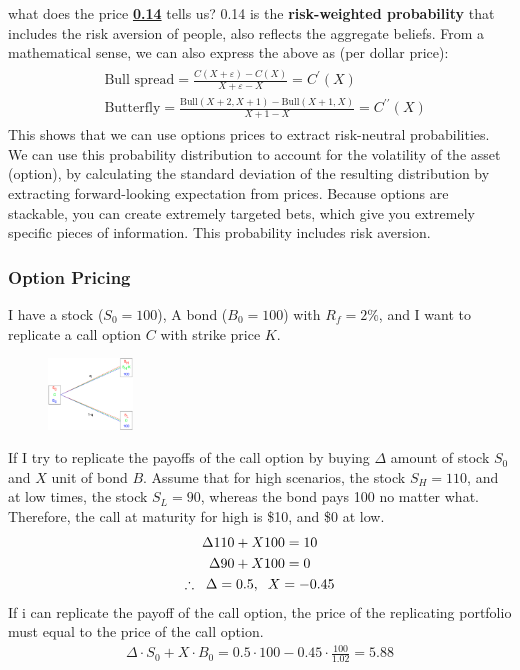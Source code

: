 \begin{multicols}{2}
what does the price \underline{\textbf{0.14}} tells us? 0.14 is the \textbf{risk-weighted probability} that includes the risk aversion of people, also reflects the aggregate beliefs. From a mathematical sense, we can also express the above as (per dollar price):
\begin{gather*}
    \begin{split}
        &\text{Bull spread} = \frac{C(X+\varepsilon)-C(X)}{X+\varepsilon-X} = \boxed{C^\prime(X)}\\[0.2cm]
        &\text{Butterfly} = \frac{\text{Bull}(X+2,X+1)-\text{Bull}(X+1,X)}{X+1-X}=\boxed{C^{\prime\prime}(X)}
    \end{split}
\end{gather*}
This shows that we can use options prices to extract risk-neutral probabilities. We can use this probability distribution to account for the volatility of the asset (option), by calculating the standard deviation of the resulting distribution by extracting forward-looking expectation from prices. Because options are stackable, you can create extremely targeted bets, which give you extremely specific pieces of information. This probability includes risk aversion. 

\subsubsection{Option Pricing}
I have a stock ($S_0=100$), A bond ($B_0=100$) with $R_f=2\%$, and I want to replicate a call option $C$ with strike price $K$. 
\begin{figure}[H]
    \centering 
    \includegraphics[width =0.2\textwidth]{Figure/tree.png}
\end{figure}
If I try to replicate the payoffs of the call option by buying $\Delta$ amount of stock $S_0$ and $X$ unit of bond $B$. Assume that for high scenarios, the stock $S_H = 110$, and at low times, the stock $S_L = 90$, whereas the bond pays 100 no matter what. Therefore, the call at maturity for high is \$10, and \$0 at low. 
\begin{gather*}
    \Delta110+X100=10\\
    \Delta90+X100=0\\
    \therefore\hspace*{0.2cm}\Delta = 0.5,\hspace*{0.2cm}X=-0.45
\end{gather*}
If i can replicate the payoff of the call option, the price of the replicating portfolio must equal to the price of the call option.
\begin{gather*}
    \Delta\cdot S_0 + X\cdot B_0 = 0.5\cdot100-0.45\cdot\frac{100}{1.02} = 5.88
\end{gather*}


\end{multicols}
